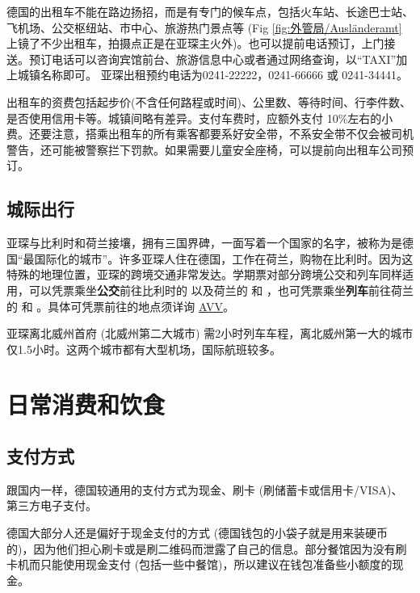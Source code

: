     德国的出租车不能在路边扬招，而是有专门的候车点，包括火车站、长途巴士站、飞机场、公交枢纽站、市中心、旅游热门景点等 (Fig \ref{fig:外管局/Ausländeramt} 上镜了不少出租车，拍摄点正是在亚琛主火外)。也可以提前电话预订，上门接送。预订电话可以咨询宾馆前台、旅游信息中心或者通过网络查询，以``TAXI''加上城镇名称即可。 亚琛出租预约电话为0241-22222，0241-66666 或 0241-34441。

    出租车的资费包括起步价(不含任何路程或时间)、公里数、等待时间、行李件数、是否使用信用卡等。城镇间略有差异。支付车费时，应额外支付 10\%左右的小费。还要注意，搭乘出租车的所有乘客都要系好安全带，不系安全带不仅会被司机警告，还可能被警察拦下罚款。如果需要儿童安全座椅，可以提前向出租车公司预订。

  \subsection{城际出行}\label{subsec:城际出行}

    亚琛与比利时和荷兰接壤，拥有三国界碑，一面写着一个国家的名字，被称为是德国``最国际化的城市''。许多亚琛人住在德国，工作在荷兰，购物在比利时。因为这特殊的地理位置，亚琛的跨境交通非常发达。学期票对部分跨境公交和列车同样适用，可以凭票乘坐\textbf{公交}前往比利时的  以及荷兰的  和 ，也可凭票乘坐\textbf{列车}前往荷兰的  和 。具体可凭票前往的地点须详询 \href{http://www.avv.de/}{AVV}。

    亚琛离北威州首府 (北威州第二大城市) 需2小时列车车程，离北威州第一大的城市仅1.5小时。这两个城市都有大型机场，国际航班较多。

\section{日常消费和饮食}\label{sec:日常消费和饮食}

  \subsection{支付方式}\label{subsec:支付方式}

    跟国内一样，德国较通用的支付方式为现金、刷卡 (刷储蓄卡或信用卡/VISA)、第三方电子支付。

    德国大部分人还是偏好于现金支付的方式 (德国钱包的小袋子就是用来装硬币的)，因为他们担心刷卡或是刷二维码而泄露了自己的信息。部分餐馆因为没有刷卡机而只能使用现金支付 (包括一些中餐馆)，所以建议在钱包准备些小额度的现金。

